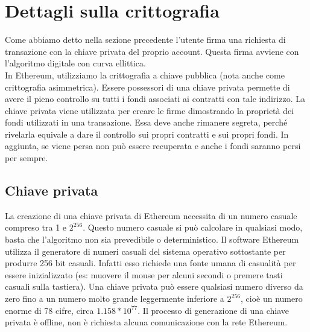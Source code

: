 \documentclass[a4paper,11pt]{report}
\begin{document}
\section{Dettagli sulla crittografia}
Come abbiamo detto nella sezione precedente l'utente firma una richiesta di transazione con la chiave privata del proprio account. Questa firma avviene con l'algoritmo digitale con curva ellittica.\\
In Ethereum, utilizziamo la crittografia a chiave pubblica (nota anche come crittografia asimmetrica).
Essere possessori di una chiave privata permette di avere il pieno controllo su tutti i fondi associati ai contratti con tale indirizzo. 
La chiave privata viene utilizzata per creare le firme dimostrando la proprietà dei fondi utilizzati in una transazione. Essa deve anche rimanere segreta, perché rivelarla equivale a dare il controllo sui propri contratti e sui propri fondi. In aggiunta, se viene persa non può essere recuperata e anche i fondi saranno persi per sempre.\\

\subsection{Chiave privata}
La creazione di una chiave privata di Ethereum necessita di un numero casuale compreso tra 1 e $2^{256}$. Questo numero casuale si può calcolare in qualsiasi modo, basta che l'algoritmo non sia prevedibile o deterministico. Il software Ethereum utilizza il generatore di numeri casuali del sistema operativo sottostante per produrre 256 bit casuali. Infatti esso richiede una fonte umana di casualità per essere inizializzato (es: muovere il mouse per alcuni secondi o premere tasti casuali sulla tastiera).
Una chiave privata può essere qualsiasi numero diverso da zero fino a un numero molto grande leggermente inferiore a $2^{256}$, cioè un numero enorme di 78 cifre, circa $1.158*10^{77}$.
Il processo di generazione di una chiave privata è offline, non è richiesta alcuna comunicazione con la rete Ethereum. 
\end{document}
